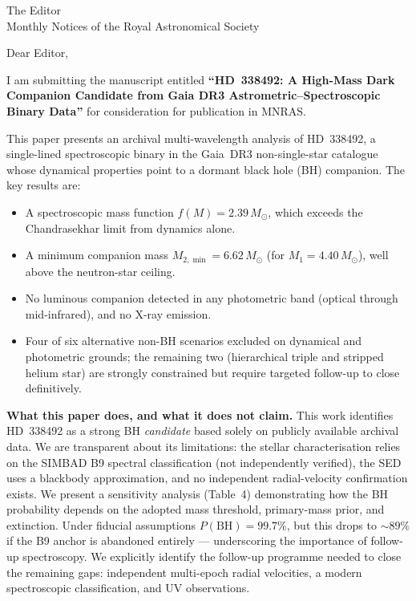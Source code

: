 \documentclass[11pt]{letter}
\begin{document}
\begin{letter}{The Editor\\Monthly Notices of the Royal Astronomical Society}

\opening{Dear Editor,}

I am submitting the manuscript entitled \textbf{``HD~338492: A
High-Mass Dark Companion Candidate from Gaia DR3
Astrometric--Spectroscopic Binary Data''} for consideration for
publication in MNRAS.

This paper presents an archival multi-wavelength analysis of
HD~338492, a single-lined spectroscopic binary in the Gaia~DR3
non-single-star catalogue whose dynamical properties point to a
dormant black hole (BH) companion.  The key results are:

\begin{itemize}
\item A spectroscopic mass function $f(M) = 2.39\,M_\odot$, which
  exceeds the Chandrasekhar limit from dynamics alone.
\item A minimum companion mass $M_{2,\min} = 6.62\,M_\odot$ (for
  $M_1 = 4.40\,M_\odot$), well above the neutron-star ceiling.
\item No luminous companion detected in any photometric band
  (optical through mid-infrared), and no X-ray emission.
\item Four of six alternative non-BH scenarios excluded on dynamical
  and photometric grounds; the remaining two (hierarchical triple
  and stripped helium star) are strongly constrained but require
  targeted follow-up to close definitively.
\end{itemize}

\textbf{What this paper does, and what it does not claim.}
This work identifies HD~338492 as a strong BH \emph{candidate}
based solely on publicly available archival data.  We are
transparent about its limitations: the stellar characterisation
relies on the SIMBAD B9 spectral classification (not independently
verified), the SED uses a blackbody approximation, and no
independent radial-velocity confirmation exists.  We present a
sensitivity analysis (Table~4) demonstrating how the BH probability
depends on the adopted mass threshold, primary-mass prior, and
extinction.  Under fiducial assumptions $P(\mathrm{BH}) = 99.7\%$,
but this drops to $\sim\!89\%$ if the B9 anchor is abandoned
entirely --- underscoring the importance of follow-up
spectroscopy.  We explicitly identify the follow-up programme
needed to close the remaining gaps: independent multi-epoch
radial velocities, a modern spectroscopic classification, and UV
observations.


\end{letter}
\end{document}
